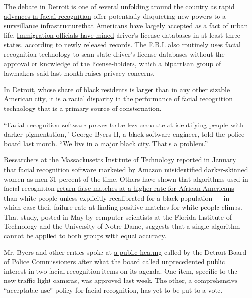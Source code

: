The debate in Detroit is one of
\href{https://www.nytimes3xbfgragh.onion/2019/07/01/us/facial-recognition-san-francisco.html}{several
unfolding around the country} as
\href{https://www.nytimes3xbfgragh.onion/2017/11/28/technology/artificial-intelligence-research-toronto.html}{rapid
advances in facial recognition} offer potentially disquieting new powers
to a
\href{https://www.nytimes3xbfgragh.onion/2018/05/26/us/chicago-police-surveillance.html}{surveillance
infrastructure}that Americans have largely accepted as a fact of urban
life.
\href{https://www.nytimes3xbfgragh.onion/2019/07/07/us/politics/ice-drivers-licenses-facial-recognition.html}{Immigration
officials have mined} driver's license databases in at least three
states, according to newly released records. The F.B.I. also routinely
uses facial recognition technology to scan state driver's license
databases without the approval or knowledge of the license-holders,
which a bipartisan group of lawmakers said last month raises privacy
concerns.

In Detroit, whose share of black residents is larger than in any other
sizable American city, it is a racial disparity in the performance of
facial recognition technology that is a primary source of consternation.

``Facial recognition software proves to be less accurate at identifying
people with darker pigmentation,'' George Byers II, a black software
engineer, told the police board last month. ``We live in a major black
city. That's a problem.''

Researchers at the Massachusetts Institute of Technology
\href{https://www.nytimes3xbfgragh.onion/2019/01/24/technology/amazon-facial-technology-study.html}{reported
in January} that facial recognition software marketed by Amazon
misidentified darker-skinned women as men 31 percent of the time. Others
have shown that algorithms used in facial recognition
\href{https://arxiv.org/pdf/1904.07325.pdf}{return false matches at a
higher rate for African-Americans} than white people unless explicitly
recalibrated for a black population --- in which case their failure rate
at finding positive matches for white people climbs.
\href{https://arxiv.org/pdf/1904.07325.pdf}{That study}, posted in May
by computer scientists at the Florida Institute of Technology and the
University of Notre Dame, suggests that a single algorithm cannot be
applied to both groups with equal accuracy.

Mr. Byers and other critics spoke at
\href{http://video.detroitmi.gov/CablecastPublicSite/show/7361?channel=3}{a
public hearing} called by the Detroit Board of Police Commissioners
after what the board called unprecedented public interest in two facial
recognition items on its agenda. One item, specific to the new traffic
light cameras, was approved last week. The other, a comprehensive
``acceptable use'' policy for facial recognition, has yet to be put to a
vote.

